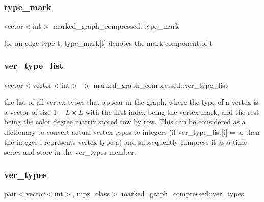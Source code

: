 \subsubsection{\texorpdfstring{type\+\_\+mark}{type\_mark}}
{\footnotesize\ttfamily vector$<$int$>$ marked\+\_\+graph\+\_\+compressed\+::type\+\_\+mark}



for an edge type t, type\+\_\+mark\mbox{[}t\mbox{]} denotes the mark component of t 

\mbox{\label{classmarked__graph__compressed_af2e3e55223d436628a02758dfae88493}} 
\subsubsection{\texorpdfstring{ver\+\_\+type\+\_\+list}{ver\_type\_list}}
{\footnotesize\ttfamily vector$<$vector$<$int$>$ $>$ marked\+\_\+graph\+\_\+compressed\+::ver\+\_\+type\+\_\+list}



the list of all vertex types that appear in the graph, where the type of a vertex is a vector of size $1+L \times L$ with the first index being the vertex mark, and the rest being the color degree matrix stored row by row. This can be considered as a dictionary to convert actual vertex types to integers (if ver\+\_\+type\+\_\+list\mbox{[}i\mbox{]} = a, then the integer i represents vertex type a) and subsequently compress it as a time series and store in the ver\+\_\+types member. 

\mbox{\label{classmarked__graph__compressed_af446cc5e23c241a92b76642fd5ebc403}} 
\subsubsection{\texorpdfstring{ver\+\_\+types}{ver\_types}}
{\footnotesize\ttfamily pair$<$vector$<$int$>$, mpz\+\_\+class$>$ marked\+\_\+graph\+\_\+compressed\+::ver\+\_\+types}



